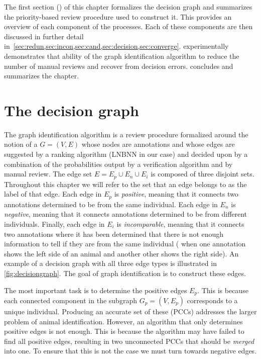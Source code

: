 The first section () of this chapter formalizes the decision graph and summarizes the
  priority-based review procedure used to construct it.
This provides an overview of each component of the processes.
Each of these components are then discussed in further detail
  in~\cref{sec:redun,sec:incon,sec:cand,sec:decision,sec:converge}.
 experimentally demonstrates that ability of the graph identification algorithm to reduce the
  number of manual reviews and recover from decision errors.
 concludes and summarizes the chapter.


\FloatBarrier{}
\section{The decision graph}\label{sec:decisiongraph}

The graph identification algorithm is a review procedure formalized around the notion of a  $G = (V, E)$ whose nodes are annotations and whose edges are suggested by a ranking algorithm (LNBNN in
  our case) and decided upon by a combination of the probabilities output by a verification algorithm and by manual
  review.
The edge set $E = E_p \cup E_n \cup E_i$ is composed of three disjoint sets.
Throughout this chapter we will refer to the set that an edge belongs to as the label of that edge.
Each edge in $E_p$ is \emph{positive}, meaning that it connects two annotations determined to be from the same
  individual.
Each edge in $E_n$ is \emph{negative}, meaning that it connects annotations determined to be from different
  individuals.
Finally, each edge in $E_i$ is \emph{incomparable}, meaning that it connects two annotations where it has been
  determined that there is not enough information to tell if they are from the same individual (\eg{} when one
  annotation shows the left side of an animal and another other shows the right side).
An example of a decision graph with all three edge types is illustrated in \cref{fig:decisiongraph}.
The goal of graph identification is to construct these edges.

\decisiongraph{}

The most important task is to determine the positive edges $E_p$.
This is because each connected component in the subgraph $G_p = (V, E_p)$ corresponds to a unique individual.
Producing an accurate set of these  (PCCs) addresses the larger problem
  of animal identification.
However, an algorithm that only determines positive edges is not enough.
This is because the algorithm may have failed to find all positive edges, resulting in two unconnected PCCs that
  should be \emph{merged} into one.
To ensure that this is not the case we must turn towards negative edges.

